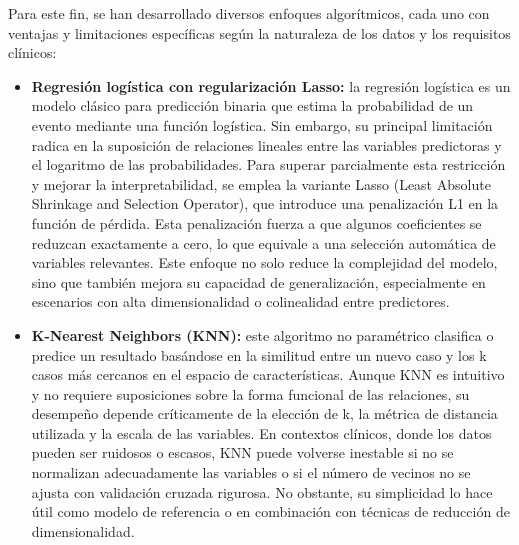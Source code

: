 Para este fin, se han desarrollado diversos enfoques algorítmicos, cada uno con ventajas y limitaciones específicas según la naturaleza de los datos y los requisitos clínicos:

\begin{itemize}
    \item \textbf{Regresión logística con regularización Lasso:} la regresión logística es un modelo clásico para predicción binaria que estima la probabilidad de un evento mediante una función logística. Sin embargo, su principal limitación radica en la suposición de relaciones lineales entre las variables predictoras y el logaritmo de las probabilidades. Para superar parcialmente esta restricción y mejorar la interpretabilidad, se emplea la variante Lasso (Least Absolute Shrinkage and Selection Operator), que introduce una penalización L1 en la función de pérdida. Esta penalización fuerza a que algunos coeficientes se reduzcan exactamente a cero, lo que equivale a una selección automática de variables relevantes. Este enfoque no solo reduce la complejidad del modelo, sino que también mejora su capacidad de generalización, especialmente en escenarios con alta dimensionalidad o colinealidad entre predictores.

    \item \textbf{K-Nearest Neighbors (KNN):} este algoritmo no paramétrico clasifica o predice un resultado basándose en la similitud entre un nuevo caso y los k casos más cercanos en el espacio de características. Aunque KNN es intuitivo y no requiere suposiciones sobre la forma funcional de las relaciones, su desempeño depende críticamente de la elección de k, la métrica de distancia utilizada y la escala de las variables. En contextos clínicos, donde los datos pueden ser ruidosos o escasos, KNN puede volverse inestable si no se normalizan adecuadamente las variables o si el número de vecinos no se ajusta con validación cruzada rigurosa. No obstante, su simplicidad lo hace útil como modelo de referencia o en combinación con técnicas de reducción de dimensionalidad.


\end{itemize}
